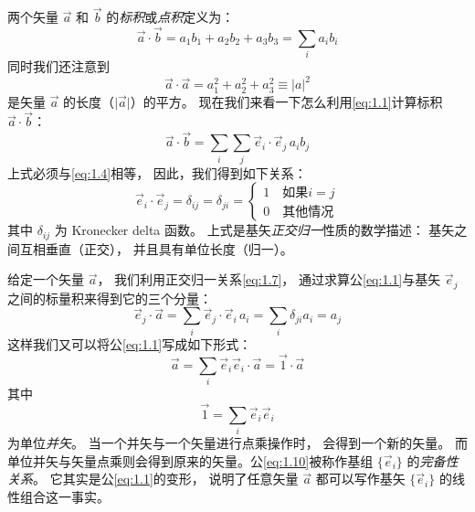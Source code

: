两个矢量 $\vec{a}$ 和 $\vec{b}$ 的\emph{标积}或\emph{点积}定义为：
\begin{equation}
 \vec{a}\cdot\vec{b} = a_1 b_1 + a_2 b_2 + a_3 b_3 = \sum_i a_i b_i
 \label{eq:1.4}
\end{equation}
同时我们还注意到
\begin{equation}
 \vec{a}\cdot\vec{a} = a_1^2 + a_2^2 + a_3^2 \equiv \vert a\vert^2
 \label{eq:1.5}
\end{equation}
是矢量 $\vec{a}$ 的长度（$\vert \vec{a}\vert$）的平方。
现在我们来看一下怎么利用\autoref{eq:1.1}计算标积 $\vec{a}\cdot\vec{b}$：
\begin{equation}
 \vec{a}\cdot\vec{b} = \sum_i\sum_j \vec{e}_i\cdot\vec{e}_j\, a_i b_j
 \label{eq:1.6}
\end{equation}
上式必须与\autoref{eq:1.4}相等，
因此，我们得到如下关系：
\begin{equation}
 \vec{e}_i \cdot \vec{e}_j = \delta_{ij} = \delta_{ji} = 
          \begin{cases}
           1 \quad \text{如果$i=j$} \\
                    0 \quad \text{其他情况}
 \end{cases}
 \label{eq:1.7}
\end{equation}
其中 $\delta_{ij}$ 为 Kronecker delta 函数。
上式是基矢\emph{正交归一}性质的数学描述：
基矢之间互相垂直（正交），
并且具有单位长度（归一）。 

给定一个矢量 $\vec{a}$，
我们利用正交归一关系\autoref{eq:1.7}，
通过求算公\autoref{eq:1.1}与基矢 $\vec{e}_j$ 之间的标量积来得到它的三个分量：
\begin{equation}
 \vec{e}_j \cdot \vec{a} = \sum_i \vec{e}_j \cdot \vec{e}_i\, a_i = \sum_i \delta_{ji} a_i = a_j
 \label{eq:1.8}
\end{equation}
这样我们又可以将公\autoref{eq:1.1}写成如下形式：
\begin{equation}
 \vec{a} = \sum_i \vec{e}_i\vec{e}_i \cdot \vec{a} = \vec{1}\cdot\vec{a}
 \label{eq:1.9}
\end{equation}
其中
\begin{equation}
 \vec{1} = \sum_i \vec{e}_i \vec{e}_i
 \label{eq:1.10}
\end{equation}
为单位\emph{并矢}。
当一个并矢与一个矢量进行点乘操作时，
会得到一个新的矢量。
而单位并矢与矢量点乘则会得到原来的矢量。公\autoref{eq:1.10}被称作基组 $\{\vec{e}_i\}$ 的\emph{完备性关系}。
它其实是公\autoref{eq:1.1}的变形，
说明了任意矢量 $\vec{a}$ 都可以写作基矢
$\{\vec{e}_i\}$ 的线性组合这一事实。


